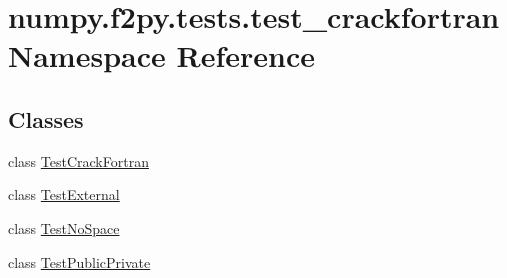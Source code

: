 \hypertarget{namespacenumpy_1_1f2py_1_1tests_1_1test__crackfortran}{}\section{numpy.\+f2py.\+tests.\+test\+\_\+crackfortran Namespace Reference}
\label{namespacenumpy_1_1f2py_1_1tests_1_1test__crackfortran}
\subsection*{Classes}
\begin{DoxyCompactItemize}
\item 
class \hyperlink{classnumpy_1_1f2py_1_1tests_1_1test__crackfortran_1_1TestCrackFortran}{Test\+Crack\+Fortran}
\item 
class \hyperlink{classnumpy_1_1f2py_1_1tests_1_1test__crackfortran_1_1TestExternal}{Test\+External}
\item 
class \hyperlink{classnumpy_1_1f2py_1_1tests_1_1test__crackfortran_1_1TestNoSpace}{Test\+No\+Space}
\item 
class \hyperlink{classnumpy_1_1f2py_1_1tests_1_1test__crackfortran_1_1TestPublicPrivate}{Test\+Public\+Private}
\end{DoxyCompactItemize}
